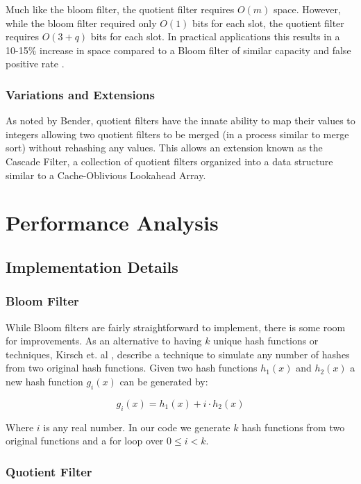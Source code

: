 \documentclass[twoside]{article}
\begin{document}
Much like the bloom filter, the quotient filter requires $O(m)$ space. However, while the bloom filter required only $O(1)$ bits for each slot, the quotient filter requires $O(3 + q)$ bits for each slot. In practical applications this results in a 10-15\% increase in space compared to a Bloom filter of similar capacity and false positive rate \cite{spillane}.

\subsubsection{Variations and Extensions}

As noted by Bender\cite{bender}, quotient filters have the innate ability to map their values to integers allowing two quotient filters to be merged (in a process similar to merge sort) without rehashing any values. This allows an extension known as the Cascade Filter, a collection of quotient filters organized into a data structure similar to a Cache-Oblivious Lookahead Array\cite{bender2}.

\section{Performance Analysis}

\subsection{Implementation Details}

\subsubsection{Bloom Filter}

While Bloom filters are fairly straightforward to implement, there is some room for improvements. As an alternative to having $k$ unique hash functions or techniques, Kirsch et. al \cite{kirsch}, describe a technique to simulate any number of hashes from two original hash functions. Given two hash functions $h_1(x)$ and $h_2(x)$ a new hash function $g_i(x)$ can be generated by:

\begin{equation}
g_i(x) = h_1(x) + i \cdot h_2(x)
\end{equation}

Where $i$ is any real number. In our code we generate $k$ hash functions from two original functions and a for loop over $0 \leq i < k$.

\subsubsection{Quotient Filter}
\end{document}

